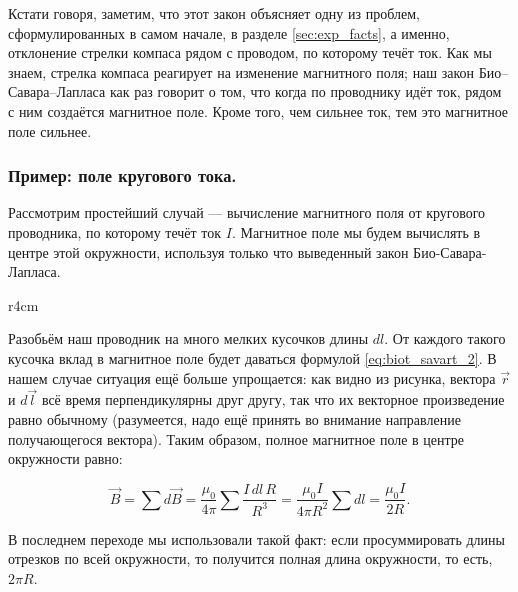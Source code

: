 \documentclass[a4paper,12pt]{article}
\begin{document}
Кстати говоря, заметим, что этот закон объясняет одну из проблем,
сформулированных в самом начале, в разделе \ref{sec:exp_facts}, а
именно, отклонение стрелки компаса рядом с проводом, по которому течёт
ток. Как мы знаем, стрелка компаса реагирует на изменение магнитного
поля; наш закон Био--Савара--Лапласа как раз говорит о том, что когда
по проводнику идёт ток, рядом с ним создаётся магнитное поле. Кроме
того, чем сильнее ток, тем это магнитное поле сильнее. 

\subsubsection{Пример: поле кругового тока.}
\label{sec:ex_current_circle}

Рассмотрим простейший случай — вычисление магнитного поля
от кругового проводника, по которому течёт ток $I$. Магнитное поле мы
будем вычислять в центре этой окружности, используя только что
выведенный закон Био-Савара-Лапласа.

\begin{wrapfigure}{r}{4cm}
\centering
{}
\label{fig:current_circle}
\end{wrapfigure}

Разобьём наш проводник на много мелких кусочков длины $dl$. От каждого
такого кусочка вклад в магнитное поле будет даваться формулой
\eqref{eq:biot_savart_2}. В нашем случае ситуация ещё больше
упрощается: как видно из рисунка, вектора $\vec{r}$ и $d\vec{l}$ всё
время перпендикулярны друг другу, так что их векторное произведение
равно обычному (разумеется, надо ещё принять во внимание направление
получающегося вектора). Таким образом, полное магнитное поле в центре
окружности равно: 

\begin{equation}
  \label{eq:ex_current_circle}
  \vec{B} = \sum d\vec{B} = \frac{\mu_0}{4\pi} \sum \frac{I\, dl\, R}{R^3} =
  \frac{\mu_0 I}{4 \pi R^2} \sum dl = \frac{\mu_0 I}{2R}.
\end{equation}

В последнем переходе мы использовали такой факт: если просуммировать
длины отрезков по всей окружности, то получится полная длина
окружности, то есть, $2\pi R$.
\end{document}
